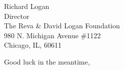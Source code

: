 \documentclass[11pt]{letter}
\begin{document}
\begin{letter}{
    Richard Logan \\
    Director \\
    The Reva \& David Logan Foundation \\
    980 N. Michigan Avenue \#1122 \\
    Chicago, IL, 60611
  }
  \closing{
    Good luck in the meantime, \\
     \\
  }
\end{letter}
\end{document}
